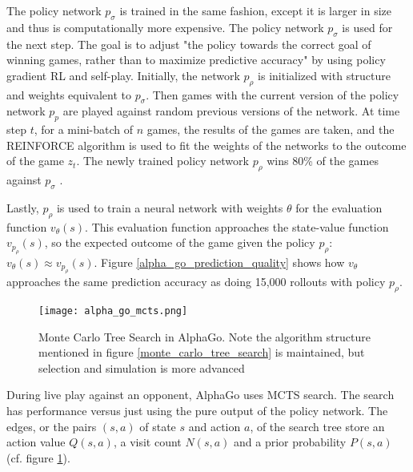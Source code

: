 The policy network $p_{\sigma}$ is trained in the same fashion, except it is larger in size and thus is computationally more expensive. The policy network $p_{\sigma}$ is used for the next step. The goal is to adjust "the policy towards the correct goal of winning games, rather than to maximize predictive accuracy" \cite[p.484]{silver_mastering_2016} by using policy gradient RL and self-play. Initially, the network $p_{\rho}$ is initialized with structure and weights equivalent to $p_{\sigma}$. Then games with the current version of the policy network $p_{p}$ are played against random previous versions of the network. At time step $t$, for a mini-batch of $n$ games, the results of the games are taken, and the REINFORCE algorithm \cite{williams_simple_1992} is used to fit the weights of the networks to the outcome of the game $z_t$. The newly trained policy network $p_{\rho}$ wins 80\% of the games against $p_{\sigma}$ \cite[p. 485]{silver_mastering_2016}.

Lastly, $p_{\rho}$ is used to train a neural network with weights $\theta$ for the evaluation function $v_{\theta}(s)$. This evaluation function approaches the state-value function $v_{p_{\rho}}(s)$, so the expected outcome of the game given the policy $p_{\rho}$: $v_{\theta}(s) \approx v_{p_{\rho}}(s)$. Figure \ref{alpha_go_prediction_quality} shows how $v_{\theta}$ approaches the same prediction accuracy as doing 15,000 rollouts with policy $p_{\rho}$.

\begin{figure}
    \centering
    \texttt{[image: alpha\_go\_mcts.png]}
    \caption{Monte Carlo Tree Search in AlphaGo. \cite{silver_mastering_2016} Note the algorithm structure mentioned in figure \ref{monte_carlo_tree_search} is maintained, but selection and simulation is more advanced}
    \label{alpha_go_mcts}
\end{figure}

During live play against an opponent, AlphaGo uses MCTS search. The search has performance versus just using the pure output of the policy network. The edges, or the pairs $(s,a)$ of state $s$ and action $a$, of the search tree store an action value $Q(s, a)$, a visit count $N(s, a)$ and a prior probability $P(s, a)$ (cf. figure \ref{alpha_go_mcts}).

